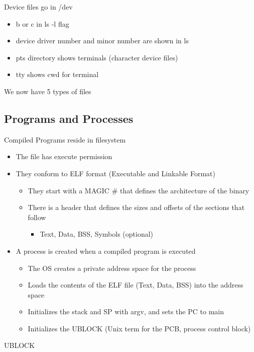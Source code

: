 Device files go in /dev
\begin{itemize}
    \item b or c in ls -l flag
    \item device driver number and minor number are shown in ls
    \item pts directory shows terminals (character device files)
    \item tty shows cwd for terminal
\end{itemize}
We now have 5 types of files

\subsection{Programs and Processes}
Compiled Programs reside in filesystem
\begin{itemize}
    \item The file has execute permission
    \item They conform to ELF format (Executable and Linkable Format)
    \begin{itemize}
        \item They start with a MAGIC \# that defines the architecture of the binary
        \item There is a header that defines the sizes and offsets of the sections that follow
        \begin{itemize}
            \item Text, Data, BSS, Symbols (optional)
        \end{itemize}
    \end{itemize}
    \item A process is created when a compiled program is executed
    \begin{itemize}
        \item The OS creates a private address space for the process
        \item Loads the contents of the ELF file (Text, Data, BSS) into the address space
        \item Initializes the stack and SP with argv, and sets the PC to main
        \item Initializes the UBLOCK (Unix term for the PCB, process control block)
    \end{itemize}
\end{itemize}
UBLOCK
